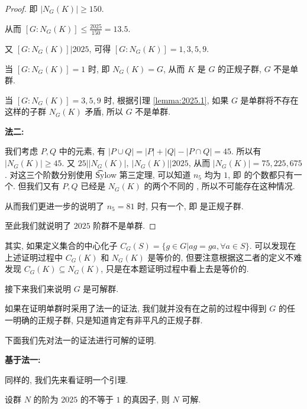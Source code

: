 \begin{proof}
即 $|N_G(K)|\geqslant 150$.

从而 $[G:N_G(K)]\leqslant\frac{2025}{150}=13.5$.

又 $[G:N_G(K)]|2025$, 可得 $[G:N_G(K)]=1,3,5,9$.

当 $[G:N_G(K)]=1$ 时, 即 $N_G(K)=G$, 从而 $K$ 是 $G$ 的正规子群, $G$ 不是单群.

当 $[G:N_G(K)]=3,5,9$ 时, 根据引理 \ref{lemma:2025.1}, 如果 $G$ 是单群将不存在这样的子群 $N_G(K)$ 矛盾, 所以 $G$ 不是单群.

\noindent\textbf{法二:}

我们考虑 $P,Q$ 中的元素, 有 $|P\cup Q|=|P|+|Q|-|P\cap Q|=45$. 所以有 $|N_G(K)|\geqslant 45$.
又 $25\big||N_G(K)|,\ |N_G(K)|\big|2025$, 从而 $|N_G(K)|=75,225,675$.
对这三个阶数分别使用 \t{Sylow} 第三定理, 可以知道 $n_5$ 均为 $1$, 即 \Sy[5]的个数都只有一个.
但我们又有 $P,Q$ 已经是 $N_G(K)$ 的两个不同的 \Sy[5], 所以不可能存在这种情况.

从而我们更进一步的说明了 $n_5=81$ 时, \Sy[3]只有一个, 即 \Sy[3]是正规子群.

至此我们就说明了 $2025$ 阶群不是单群.
\end{proof}

\begin{remark}
	其实, 如果定义集合的中心化子 $C_G(S)=\{g\in G|ag=ga,\forall a\in S\}$. 可以发现在上述证明过程中 $C_G(K)$ 和 $N_G(K)$ 是等价的, 但要注意根据这二者的定义不难发现 $C_G(K)\subseteq N_G(K)$, 只是在本题证明过程中看上去是等价的.
\end{remark}

接下来我们来说明 $G$ 是可解群.

如果在证明单群时采用了法一的证法, 我们就并没有在之前的过程中得到 $G$ 的任一明确的正规子群, 只是知道肯定有非平凡的正规子群.

下面我们先对法一的证法进行可解的证明.

\noindent\textbf{基于法一:}

同样的, 我们先来看证明一个引理.

\begin{lemma}\label{lemma:2025.2}
	设群 $N$ 的阶为 $2025$ 的不等于 $1$ 的真因子, 则 $N$ 可解.
\end{lemma}

